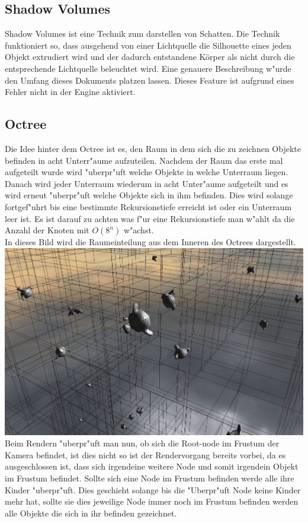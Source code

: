 \documentclass[a4paper,titlepage]{article}
\begin{document}
\subsection{Shadow Volumes}
Shadow Volumes ist eine Technik zum darstellen von Schatten. Die Technik funktioniert so, dass ausgehend von 
einer Lichtquelle die Silhouette eines jeden Objekt extrudiert wird und der dadurch entstandene Körper als nicht
durch die entsprechende Lichtquelle beleuchtet wird. Eine genauere Beschreibung w"urde den Umfang dieses Dokuments
platzen lassen. Dieses Feature ist aufgrund eines Fehler nicht in der Engine aktiviert.

\subsection{Octree}
Die Idee hinter dem Octree ist es, den Raum in dem sich die zu zeichnen Objekte befinden in acht Unterr"aume 
aufzuteilen. Nachdem der Raum das erste mal aufgeteilt wurde wird "uberpr"uft welche Objekte in welche Unterraum 
liegen. Danach wird jeder Unterraum wiederum in acht Unter"aume aufgeteilt und es wird erneut "uberpr"uft 
welche Objekte sich in ihm befinden. Dies wird solange fortgef"uhrt bis eine bestimmte Rekursionstiefe 
erreicht ist oder ein Unterraum leer ist. Es ist darauf zu achten was f"ur eine Rekursionstiefe man w"ahlt 
da die Anzahl der Knoten mit 
$O(8^n)$ w"achst.\\

In dieses Bild wird die Raumeinteilung aus dem Inneren des Octrees dargestellt.\\
\includegraphics[width = 1.0\textwidth]{oc1.png}\\

Beim Rendern "uberpr"uft man nun, ob sich die Root-node im Frustum der Kamera befindet, ist dies nicht so ist 
der Rendervorgang bereits vorbei, da es ausgeschlossen ist, dass sich irgendeine weitere Node und somit 
irgendein Objekt im Frustum befindet. Sollte sich eine Node im Frustum befinden werde alle ihre Kinder 
"uberpr"uft. Dies geschieht solange bis die "Uberpr"uft Node keine Kinder mehr hat, sollte sie dies jeweilige Node
immer noch im Frustum befinden werden alle Objekte die sich in ihr befinden gezeichnet.\\
\end{document}
